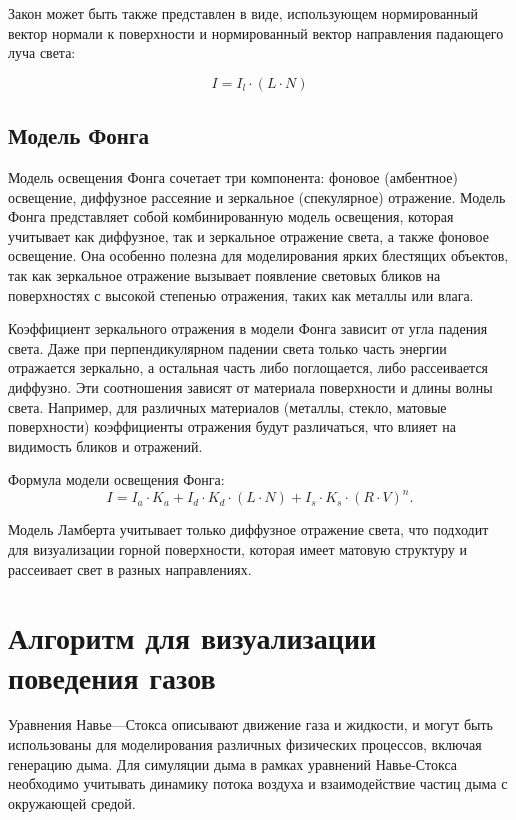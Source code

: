 Закон может быть также представлен в виде, использующем нормированный вектор нормали к поверхности и нормированный вектор направления падающего луча света:

\begin{equation}
	I = I_l \cdot (L \cdot N)
\end{equation}


\subsection{Модель Фонга}

Модель освещения Фонга сочетает три компонента: фоновое (амбентное) освещение, диффузное рассеяние и зеркальное (спекулярное) отражение.
Модель Фонга представляет собой комбинированную модель освещения, которая учитывает как диффузное, так и зеркальное отражение света, а также фоновое освещение. Она особенно полезна для моделирования ярких блестящих объектов, так как зеркальное отражение вызывает появление световых бликов на поверхностях с высокой степенью отражения, таких как металлы или влага.

Коэффициент зеркального отражения в модели Фонга зависит от угла падения света. Даже при перпендикулярном падении света только часть энергии отражается зеркально, а остальная часть либо поглощается, либо рассеивается диффузно. Эти соотношения зависят от материала поверхности и длины волны света. Например, для различных материалов (металлы, стекло, матовые поверхности) коэффициенты отражения будут различаться, что влияет на видимость бликов и отражений.

Формула модели освещения Фонга:
\begin{equation}
I = I_a \cdot K_a + I_d \cdot K_d \cdot (L \cdot N) + I_s \cdot K_s \cdot (R \cdot V)^n.
\end{equation}

Модель Ламберта учитывает только диффузное отражение света, что подходит для визуализации горной поверхности, которая имеет матовую структуру и рассеивает свет в разных направлениях.

\section{Алгоритм для визуализации поведения газов}
Уравнения Навье---Стокса описывают движение газа и жидкости, и могут быть использованы для моделирования различных физических процессов, включая генерацию дыма. Для симуляции дыма в рамках уравнений Навье-Стокса необходимо учитывать динамику потока воздуха и взаимодействие частиц дыма с окружающей средой.

